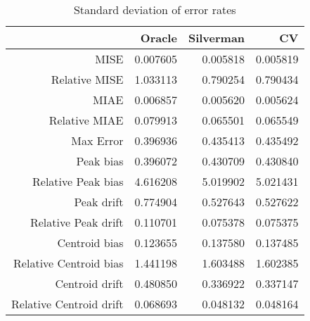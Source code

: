\begin{table}[ht]
\centering
\begin{tabular}{rrrr}
  \hline
 & Oracle & Silverman & CV \\ 
  \hline
MISE & 0.007605 & 0.005818 & 0.005819 \\ 
  Relative MISE & 1.033113 & 0.790254 & 0.790434 \\ 
  MIAE & 0.006857 & 0.005620 & 0.005624 \\ 
  Relative MIAE & 0.079913 & 0.065501 & 0.065549 \\ 
  Max Error & 0.396936 & 0.435413 & 0.435492 \\ 
  Peak bias & 0.396072 & 0.430709 & 0.430840 \\ 
  Relative Peak bias & 4.616208 & 5.019902 & 5.021431 \\ 
  Peak drift & 0.774904 & 0.527643 & 0.527622 \\ 
  Relative Peak drift & 0.110701 & 0.075378 & 0.075375 \\ 
  Centroid bias & 0.123655 & 0.137580 & 0.137485 \\ 
  Relative Centroid bias & 1.441198 & 1.603488 & 1.602385 \\ 
  Centroid drift & 0.480850 & 0.336922 & 0.337147 \\ 
  Relative Centroid drift & 0.068693 & 0.048132 & 0.048164 \\ 
   \hline
\end{tabular}
\caption{Standard deviation of error rates} 
\label{tbl:stddev_error_rates}
\end{table}
